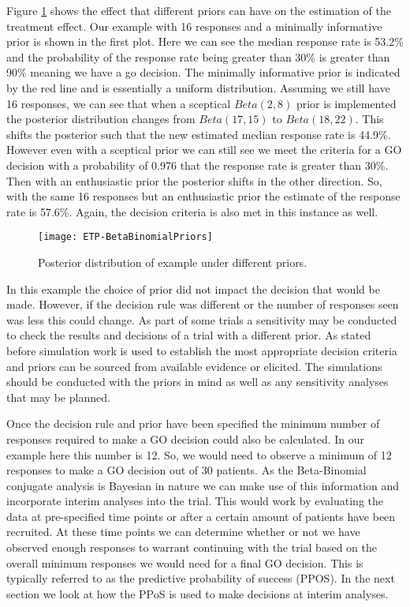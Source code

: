 Figure \ref{fig_etp:bb_example_priors} shows the effect that different priors can have on the estimation of the treatment effect. Our example with 16 responses and a minimally informative prior is shown in the first plot. Here we can see the median response rate is 53.2\% and the probability of the response rate being greater than 30\% is greater than 90\% meaning we have a go decision. The minimally informative prior is indicated by the red line and is essentially a uniform distribution. Assuming we still have 16 responses, we can see that when a sceptical $Beta(2,8)$ prior is implemented the posterior distribution changes from $Beta(17,15)$ to $Beta(18,22)$. This shifts the posterior such that the new estimated median response rate is 44.9\%. However even with a sceptical prior we can still see we meet the criteria for a GO decision with a probability of 0.976 that the response rate is greater than 30\%. Then with an enthusiastic prior the posterior shifts in the other direction. So, with the same 16 responses but an enthusiastic prior the estimate of the response rate is 57.6\%. Again, the decision criteria is also met in this instance as well.    

 \begin{figure}[h!]
	\centering
	\caption{Posterior distribution of example under different priors.}
	\label{fig_etp:bb_example_priors}
	\texttt{[image: ETP-BetaBinomialPriors]}
\end{figure}

In this example the choice of prior did not impact the decision that would be made. However, if the decision rule was different or the number of responses seen was less this could change. As part of some trials a sensitivity may be conducted to check the results and decisions of a trial with a different prior. As stated before simulation work is used to establish the most appropriate decision criteria and priors can be sourced from available evidence or elicited. The simulations should be conducted with the priors in mind as well as any sensitivity analyses that may be planned.   

Once the decision rule and prior have been specified the minimum number of responses required to make a GO decision could also be calculated. In our example here this number is 12. So, we would need to observe a minimum of 12 responses to make a GO decision out of 30 patients. As the Beta-Binomial conjugate analysis is Bayesian in nature we can make use of this information and incorporate interim analyses into the trial. This would work by evaluating the data at pre-specified time points or after a certain amount of patients have been recruited. At these time points we can determine whether or not we have observed enough responses to warrant continuing with the trial based on the overall minimum responses we would need for a final GO decision. This is typically referred to as the predictive probability of success (PPOS). In the next section we look at how the PPoS is used to make decisions at interim analyses. 

